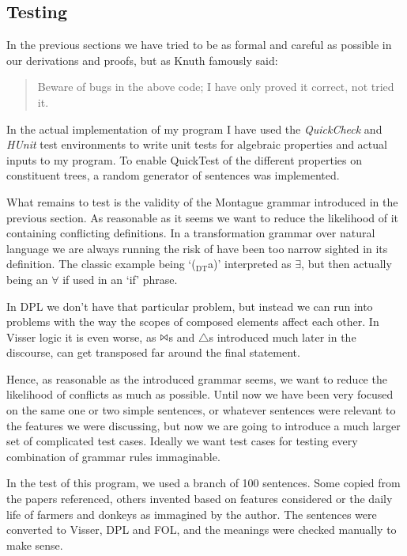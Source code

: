 \documentclass[12pt]{article}
\begin{document}
\subsection{Testing}
In the previous sections we have tried to be as formal and careful as possible in our derivations and proofs, but as Knuth famously said:

\begin{quotation}
Beware of bugs in the above code; I have only proved it correct, not tried it.
\end{quotation}

In the actual implementation of my program I have used the \emph{QuickCheck} and \emph{HUnit} test environments to write unit tests for algebraic properties and actual inputs to my program. To enable QuickTest of the different properties on constituent trees, a random generator of sentences was implemented.

What remains to test is the validity of the Montague grammar introduced in the previous section. As reasonable as it seems we want to reduce the likelihood of it containing conflicting definitions. In a transformation grammar over natural language we are always running the risk of have been too narrow sighted in its definition. The classic example being `($_\text{DT}$a)' interpreted as $\exists$, but then actually being an $\forall$ if used in an `if' phrase.

In DPL we don't have that particular problem, but instead we can run into problems with the way the scopes of composed elements affect each other. In Visser logic it is even worse, as $\Bowtie$s and $\triangle$s introduced much later in the discourse, can get transposed far around the final statement.

Hence, as reasonable as the introduced grammar seems, we want to reduce the likelihood of conflicts as much as possible. Until now we have been very focused on the same one or two simple sentences, or whatever sentences were relevant to the features we were discussing, but now we are going to introduce a much larger set of complicated test cases. Ideally we want test cases for testing every combination of grammar rules immaginable.

In the test of this program, we used a branch of 100 sentences. Some copied from the papers referenced, others invented based on features considered or the daily life of farmers and donkeys as immagined by the author. The sentences were converted to Visser, DPL and FOL, and the meanings were checked manually to make sense.
\end{document}
